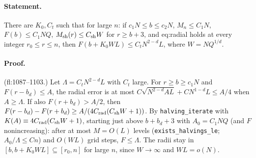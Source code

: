 \paragraph{Statement.} There are $K_0,C_t$ such that for large $n$: if $c_1N\leq b\leq c_2N$, $M_n\leq C_1N$, $F(b)\leq C_1NQ$, $M_{\rm sh}(r)\leq C_{\rm sh}W$ for $r\geq b+3$, and
eq:radial holds at every integer $r_0\leq r\leq n$, then $F(b+K_0WL)\leq C_tN^{2-d}L$, where $W=NQ^{1/d}$.
\paragraph{Proof.} (fl:1087--1103.) Let $\Lambda=C_tN^{2-d}L$ with $C_t$ large. For $r\geq b\geq c_1N$ and $F(r-b_d)\leq A$, the radial error is at most
$C\sqrt{N^{2-d}AL}+CN^{1-d}L\leq A/4$ when $A\geq\Lambda$. If also $F(r+b_d)>A/2$, then $F(r-b_d)-F(r+b_d)\geq A/(4C_{\rm rad}(C_{\rm sh}W+1))$. By
\texttt{halving\_iterate} with $K(A)\equiv4C_{\rm rad}(C_{\rm sh}W+1)$, starting just above $b+b_d+3$ with $A_0=C_1NQ$ (and $F$ nonincreasing): after at most
$M=O(L)$ levels (\texttt{exists\_halvings\_le}; $A_0/\Lambda\leq Cn$) and $O(WL)$ grid steps, $F\leq\Lambda$. The radii stay in $[b,b+K_0WL]\subseteq[r_0,n]$
for large $n$, since $W\to\infty$ and $WL=o(N)$.
